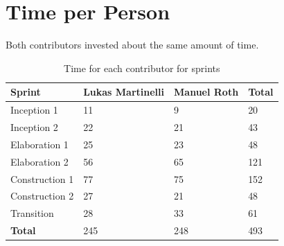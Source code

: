 \section{Time per Person}

Both contributors invested about the same amount of time.

\begin{table}[H]
\centering
    \begin{tabular}{llll}
    \textbf{Sprint}  & \textbf{Lukas Martinelli} & \textbf{Manuel Roth} & \textbf{Total} \\
    \hline
    Inception 1    & 11               & 9           & 20    \\
    Inception 2    & 22               & 21          & 43    \\
    Elaboration 1  & 25               & 23          & 48    \\
    Elaboration 2  & 56               & 65          & 121   \\
    Construction 1 & 77               & 75          & 152   \\
    Construction 2 & 27               & 21          & 48    \\
    Transition     & 28               & 33          & 61    \\
    \hline
    \textbf{Total}          & 245              & 248         & 493   \\
    \end{tabular}
    \caption{Time for each contributor for sprints}
\end{table}